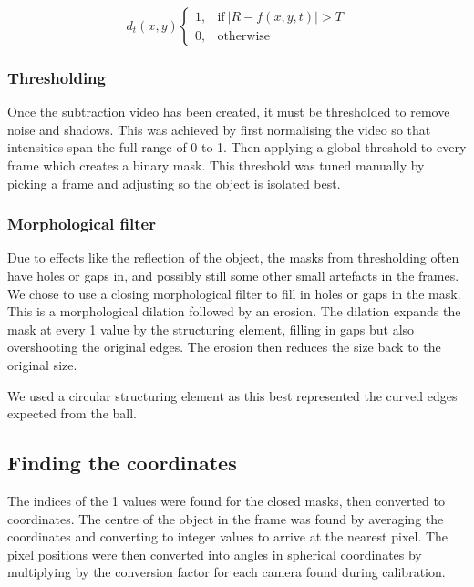 \documentclass{article}
\begin{document}
  \begin{equation}
    d_{t}(x,y)
    \begin{cases}
      1, & \text{if}\ \left| R - f(x,y,t) \right| > T \\
      0, & \text{otherwise}
    \end{cases}
    \label{eq:eq1}
  \end{equation}


\subsubsection{Thresholding}

Once the subtraction video has been created, it must be thresholded to remove noise and shadows. This was achieved by first normalising the video so that intensities span the full range of 0 to 1. Then applying a global threshold to every frame which creates a binary mask. This threshold was tuned manually by picking a frame and adjusting so the object is isolated best. 

\subsubsection{Morphological filter}

Due to effects like the reflection of the object, the masks from thresholding often have holes or gaps in, and possibly still some other small artefacts in the frames. We chose to use a closing morphological filter to fill in holes or gaps in the mask. This is a morphological dilation followed by an erosion. The dilation expands the mask at every 1 value by the structuring element, filling in gaps but also overshooting the original edges. The erosion then reduces the size back to the original size.

We used a circular structuring element as this best represented the curved edges expected from the ball. 

\subsection{Finding the coordinates}
The indices of the 1 values were found for the closed masks, then converted to coordinates. The centre of the object in the frame was found by averaging the coordinates and converting to integer values to arrive at the nearest pixel. The pixel positions were then converted into angles in spherical coordinates by multiplying by the conversion factor for each camera found during calibration.
\end{document}
